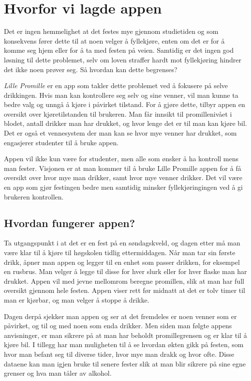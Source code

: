 \section{Hvorfor vi lagde appen}
Det er ingen hemmelighet at det festes mye gjennom studietiden og som konsekvens fører dette til at noen velger å fyllekjøre, enten om det er for å komme seg hjem eller for å ta med festen på veien. Samtidig er det ingen god løsning til dette problemet, selv om loven straffer hardt mot fyllekjøring hindrer det ikke noen prøver seg. Så hvordan kan dette begrenses?

\textit{Lille Promille} er en app som takler dette problemet ved å fokusere på selve drikkingen. Hvis man kan kontrollere seg selv og sine venner, vil man kunne ta bedre valg og unngå å kjøre i påvirket tilstand. For å gjøre dette, tilbyr appen en oversikt over kjøretilstanden til brukeren. Man får innsikt til promillenivået i blodet, antall drikker man har drukket, og hvor lenge det er til man kan kjøre bil. Det er også et vennesystem der man kan se hvor mye venner har drukket, som engasjerer studenter til å bruke appen.

Appen vil ikke kun være for studenter, men alle som ønsker å ha kontroll mens man fester. Visjonen er at man kommer til å bruke Lille Promille appen for å få oversikt over hvor mye man drikker, samt hvor mye venner drikker. Det vil være en app som gjør festingen bedre men samtidig minsker fyllekjøringingen ved å gi brukeren kontrollen.

\subsection{Hvordan fungerer appen?}
Ta utgangspunkt i at det er en fest på en søndagskveld, og dagen etter må man være klar til å kjøre til høgskolen tidlig ettermiddagen. Når man tar sin første drikk, åpner man appen og legger til en enhet som passer drikken, for eksempel en rusbrus. Man velger å legge til disse for hver slurk eller for hver flaske man har drukket. Appen vil med jevne mellomrom beregne promillen, slik at man har full oversikt gjennom hele festen. Appen viser rett før midnatt at det er tolv timer til man er kjørbar, og man velger å stoppe å drikke.

Dagen derpå sjekker man appen og ser at det fremdeles er noen venner som er påvirket, og til og med noen som enda drikker. Men siden man følgte appens anvisninger, er man sikrere på at man har beholdt promillegrensen og er klar til å kjøre bil. I tillegg har man muligheten til å se hvordan økten gikk på festen, som hvor man befant seg til diverse tider, hvor mye man drakk og hvor ofte. Disse dataene kan man igjen bruke til senere fester slik at man blir sikrere på sine egne grenser og hva man tåler av alkohol.